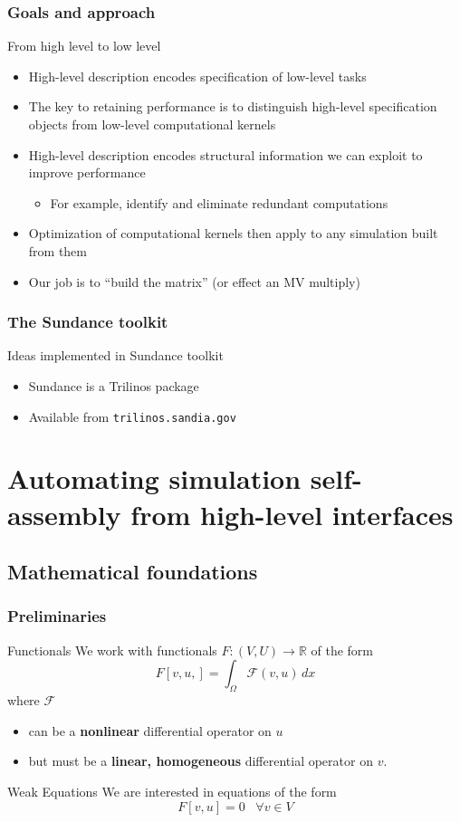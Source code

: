 \documentclass[10pt,xcolor=dvipsnames]{beamer}
\begin{document}
\frame
{
  \frametitle{Goals and approach}
  \begin{block}{From high level to low level}
  \begin{itemize}
  \item High-level description encodes specification of low-level tasks
  \item The key to retaining performance is to distinguish high-level specification objects from
low-level computational kernels
  \item High-level description encodes structural information we
can exploit to improve performance
\begin{itemize}
\item For example, identify and eliminate redundant computations
\end{itemize}
  \item Optimization of computational kernels then apply to any
simulation built from them
  \item Our job is to ``build the matrix'' (or effect an MV multiply)
  \end{itemize}
  \end{block}

}

\frame
{
  \frametitle{The Sundance toolkit}
  \begin{block}{Ideas implemented in Sundance toolkit}
  \begin{itemize}
  \item Sundance is a Trilinos package
  \item Available from {\tt trilinos.sandia.gov}
  \end{itemize}
  \end{block}

}


\section{Automating simulation self-assembly from high-level interfaces}


\subsection{Mathematical foundations}


\frame
{
  \frametitle{Preliminaries}

  \begin{block}{Functionals}
  We work with functionals $F : (V,U) \rightarrow \mathbb{R}$ of the form
\[
  F\left[v,u,\right] = \int_{\Omega} \mathcal{F}(v,u) \, dx
\]
 where $\mathcal{F}$
\begin{itemize}
\item can be a {\bf nonlinear} differential operator
on $u$
\item but must be a {\bf linear, homogeneous} differential operator on $v$.
\end{itemize}
  \end{block}
\begin{block}{Weak Equations}
  We are interested in equations of the form
\[
  F\left[v,u\right] = 0 \;\;\; \forall v \in V
\]
  \end{block}
}
\end{document}
